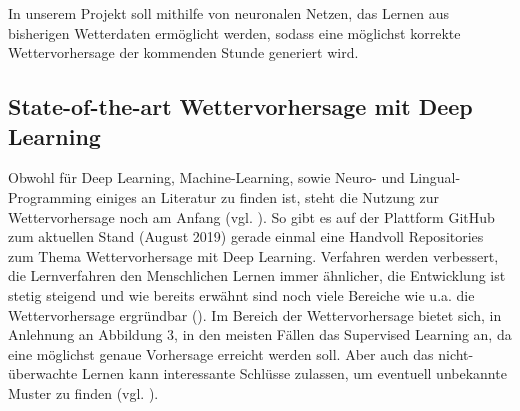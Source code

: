 In unserem Projekt soll mithilfe von neuronalen Netzen, das Lernen aus bisherigen Wetterdaten ermöglicht werden, sodass eine möglichst korrekte Wettervorhersage der kommenden Stunde generiert wird.

\subsection{State-of-the-art Wettervorhersage mit Deep Learning}
Obwohl für Deep Learning, Machine-Learning, sowie Neuro- und Lingual-Programming einiges an Literatur zu finden ist, steht die Nutzung zur Wettervorhersage noch am Anfang (vgl. \cite{ChristophFrohlich.2019}). So gibt es auf der Plattform GitHub zum aktuellen Stand (August 2019) gerade einmal eine Handvoll Repositories zum Thema Wettervorhersage mit Deep Learning. Verfahren werden verbessert, die Lernverfahren den Menschlichen Lernen immer ähnlicher, die Entwicklung ist stetig steigend und wie bereits erwähnt sind noch viele Bereiche wie u.a. die Wettervorhersage  ergründbar (\cite[S. 103]{Wick.2017}). Im Bereich der Wettervorhersage bietet sich, in Anlehnung an Abbildung 3, in den meisten Fällen das Supervised Learning an, da eine möglichst genaue Vorhersage erreicht werden soll. Aber auch das  nicht-überwachte Lernen kann interessante Schlüsse zulassen, um eventuell unbekannte Muster zu finden (vgl. \cite[S. 371]{Welsch.2018}). 
